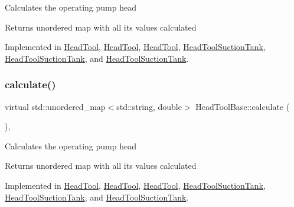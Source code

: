 Calculates the operating pump head

\begin{DoxyReturn}{Returns}
unordered map with all its values calculated 
\end{DoxyReturn}


Implemented in \hyperlink{class_head_tool_ab107e7717df4ca95404ce1952c21a84e}{Head\+Tool}, \hyperlink{class_head_tool_a146eaf45d39cf6d691fa10b4b80b5e9e}{Head\+Tool}, \hyperlink{class_head_tool_a146eaf45d39cf6d691fa10b4b80b5e9e}{Head\+Tool}, \hyperlink{class_head_tool_suction_tank_a390a38466222aa3b87d2cf2ec84537a5}{Head\+Tool\+Suction\+Tank}, \hyperlink{class_head_tool_suction_tank_a7e4a6931caa7c9be43992aecdfb80bec}{Head\+Tool\+Suction\+Tank}, and \hyperlink{class_head_tool_suction_tank_a7e4a6931caa7c9be43992aecdfb80bec}{Head\+Tool\+Suction\+Tank}.

\mbox{\label{class_head_tool_base_ab8df8f908827ce45dc5e769ea0e10f0b}} 
\subsubsection{\texorpdfstring{calculate()}{calculate()}\hspace{0.1cm}{\footnotesize\ttfamily [3/3]}}
{\footnotesize\ttfamily virtual std\+::unordered\+\_\+map$<$std\+::string, double$>$ Head\+Tool\+Base\+::calculate (\begin{DoxyParamCaption}{ }\end{DoxyParamCaption})\hspace{0.3cm}{\ttfamily [protected]}, {}}

Calculates the operating pump head

\begin{DoxyReturn}{Returns}
unordered map with all its values calculated 
\end{DoxyReturn}


Implemented in \hyperlink{class_head_tool_ab107e7717df4ca95404ce1952c21a84e}{Head\+Tool}, \hyperlink{class_head_tool_a146eaf45d39cf6d691fa10b4b80b5e9e}{Head\+Tool}, \hyperlink{class_head_tool_a146eaf45d39cf6d691fa10b4b80b5e9e}{Head\+Tool}, \hyperlink{class_head_tool_suction_tank_a390a38466222aa3b87d2cf2ec84537a5}{Head\+Tool\+Suction\+Tank}, \hyperlink{class_head_tool_suction_tank_a7e4a6931caa7c9be43992aecdfb80bec}{Head\+Tool\+Suction\+Tank}, and \hyperlink{class_head_tool_suction_tank_a7e4a6931caa7c9be43992aecdfb80bec}{Head\+Tool\+Suction\+Tank}.

